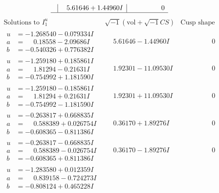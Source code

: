 \documentclass[1p]{elsarticle_modified}
\theoremstyle{definition}
\newcommand{\I}{\sqrt{-1}}
\begin{document}
$$\begin{array}{c|c|c}
 & \phantom{-}5.61646 + 1.44960 I & \phantom{-0.000000 } 0\\
 \hline 
 \end{array}$$\newpage$$\begin{array}{c|c|c}  
\text{Solutions to }I^u_{1}& \I (\text{vol} + \sqrt{-1}CS) & \text{Cusp shape}\\
 \hline 
\begin{aligned}
u &= -1.268540 - 0.079334 I \\
a &= \phantom{-}0.18558 - 2.09686 I \\
b &= -0.540326 + 0.776382 I\end{aligned}
 & \phantom{-}5.61646 - 1.44960 I & \phantom{-0.000000 } 0 \\ \hline\begin{aligned}
u &= -1.259180 + 0.185861 I \\
a &= \phantom{-}1.81294 - 0.21631 I \\
b &= -0.754992 + 1.181590 I\end{aligned}
 & \phantom{-}1.92301 - 11.09530 I & \phantom{-0.000000 } 0 \\ \hline\begin{aligned}
u &= -1.259180 - 0.185861 I \\
a &= \phantom{-}1.81294 + 0.21631 I \\
b &= -0.754992 - 1.181590 I\end{aligned}
 & \phantom{-}1.92301 + 11.09530 I & \phantom{-0.000000 } 0 \\ \hline\begin{aligned}
u &= -0.263817 + 0.668835 I \\
a &= \phantom{-}0.588389 + 0.026754 I \\
b &= -0.608365 - 0.811386 I\end{aligned}
 & \phantom{-}0.36170 + 1.89276 I & \phantom{-0.000000 } 0 \\ \hline\begin{aligned}
u &= -0.263817 - 0.668835 I \\
a &= \phantom{-}0.588389 - 0.026754 I \\
b &= -0.608365 + 0.811386 I\end{aligned}
 & \phantom{-}0.36170 - 1.89276 I & \phantom{-0.000000 } 0 \\ \hline\begin{aligned}
u &= -1.283580 + 0.012359 I \\
a &= \phantom{-}0.839158 - 0.724273 I \\
b &= -0.808124 + 0.465228 I\end{aligned}

\end{array}$$
\end{document}

